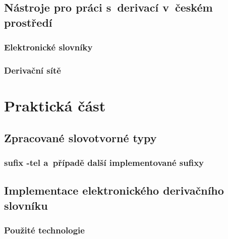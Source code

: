 \hypertarget{nuxe1stroje-pro-pruxe1ci-s-derivacuxed-v-ux10deskuxe9m-prostux159eduxed}{%
\chapter{Nástroje pro práci s~derivací v~českém
prostředí}\label{nuxe1stroje-pro-pruxe1ci-s-derivacuxed-v-ux10deskuxe9m-prostux159eduxed}}

\hypertarget{elektronickuxe9-slovnuxedky}{%
\section{Elektronické slovníky}\label{elektronickuxe9-slovnuxedky}}

\hypertarget{derivaux10dnuxed-suxedtux11b}{%
\section{Derivační sítě}\label{derivaux10dnuxed-suxedtux11b}}

\part{Praktická část}

\hypertarget{zpracovanuxe9-slovotvornuxe9-typy}{%
\chapter{Zpracované slovotvorné
typy}\label{zpracovanuxe9-slovotvornuxe9-typy}}

\hypertarget{sufix--tel-a-pux159uxedpadux11b-dalux161uxed-implementovanuxe9-sufixy}{%
\section{sufix -tel a~případě další implementované
sufixy}\label{sufix--tel-a-pux159uxedpadux11b-dalux161uxed-implementovanuxe9-sufixy}}

\hypertarget{implementace-elektronickuxe9ho-derivaux10dnuxedho-slovnuxedku}{%
\chapter{Implementace elektronického derivačního
slovníku}\label{implementace-elektronickuxe9ho-derivaux10dnuxedho-slovnuxedku}}

\hypertarget{pouux17eituxe9-technologie}{%
\section{Použité technologie}\label{pouux17eituxe9-technologie}}

